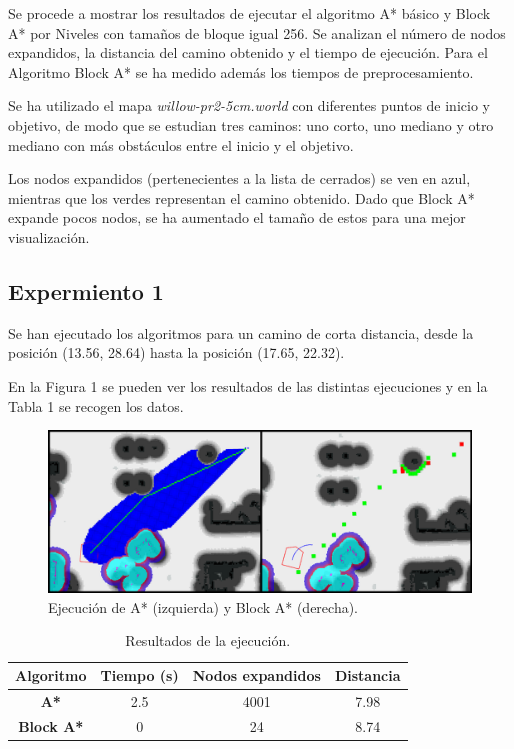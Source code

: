 \documentclass[11pt,spanish]{article} %
\begin{document}
Se procede a mostrar los resultados de ejecutar el algoritmo A* básico y Block A* por Niveles con tamaños de bloque igual 256. Se analizan el número de nodos expandidos, la distancia del camino obtenido y el tiempo de ejecución. Para el Algoritmo Block A* se ha medido además los tiempos de preprocesamiento.

Se ha utilizado el mapa \textit{willow-pr2-5cm.world} con diferentes puntos de inicio y objetivo, de modo que se estudian tres caminos: uno corto, uno mediano y otro mediano con más obstáculos entre el inicio y el objetivo.

Los nodos expandidos (pertenecientes a la lista de cerrados) se ven en azul, mientras que los verdes representan el camino obtenido. Dado que Block A* expande pocos nodos, se ha aumentado el tamaño de estos para una mejor visualización.

\subsection{Expermiento 1}

Se han ejecutado los algoritmos para un camino de corta distancia, desde la posición (13.56, 28.64) hasta la posición (17.65, 22.32).

En la Figura 1 se pueden ver los resultados de las distintas ejecuciones y en la Tabla 1 se recogen los datos.

\begin{figure}[H]
  \begin{center}
  \includegraphics[scale=.26]{1_a}
  \caption{Ejecución de A* (izquierda) y Block A* (derecha).}
  \end{center}
\end{figure}

\begin{table}[H]
\begin{center}
 \begin{tabular}{|c|c|c|c|} 
 \hline
 \rule{0cm}{0.5cm}
 \textbf{Algoritmo} & \textbf{Tiempo (s)} & \textbf{Nodos expandidos} & \textbf{Distancia} \\
 \hline\hline
 \textbf{A*}       & 2.5 & 4001 & 7.98 \\ 
 \hline
 \textbf{Block A*} & 0 & 24 & 8.74 \\
 \hline
\end{tabular}
\caption{Resultados de la ejecución.}
\end{center}
\end{table}
\end{document}
